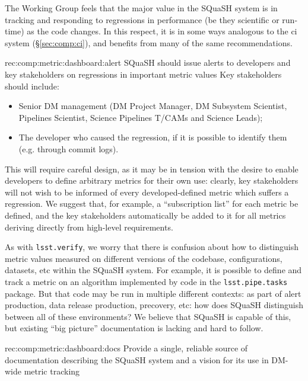 The Working Group feels that the major value in the SQuaSH system is in tracking and responding to regressions in performance (be they scientific or run-time) as the code changes.
In this respect, it is in some ways analogous to the \gls{ci} system (\S\ref{sec:comp:ci}), and benefits from many of the same recommendations.

\begin{recommendation}
    {rec:comp:metric:dashboard:alert}
    {SQuaSH should issue alerts to developers and key stakeholders on regressions in important metric values}
    Key stakeholders should include:
    \begin{itemize}
      \item{Senior DM management (DM Project Manager, DM Subsystem Scientist, Pipelines Scientist, Science Pipelines T/CAMs and Science Leads);}
      \item{The developer who caused the regression, if it is possible to identify them (e.g. through commit logs).}
    \end{itemize}
    This will require careful design, as it may be in tension with the desire to enable developers to define arbitrary metrics for their own use: clearly, key stakeholders will not wish to be informed of every developed-defined metric which suffers a regression.
    We suggest that, for example, a ``subscription list'' for each metric be defined, and the key stakeholders automatically be added to it for all metrics deriving directly from high-level requirements.
\end{recommendation}

As with \texttt{lsst.verify}, we worry that there is confusion about how to distinguish metric values measured on different versions of the codebase, configurations, datasets, etc within the SQuaSH system.
For example, it is possible to define and track a metric on an algorithm implemented by code in the \texttt{lsst.pipe.tasks} package.
But that code may be run in multiple different contexts: as part of alert production, data release production, precovery, etc: how does SQuaSH distinguish between all of these environments?
We believe that SQuaSH is capable of this, but existing ``big picture'' documentation is lacking and hard to follow.

\begin{recommendation}
  {rec:comp:metric:dashboard:docs}
  {Provide a single, reliable source of documentation describing the SQuaSH system and a vision for its use in DM-wide metric tracking}
\end{recommendation}

